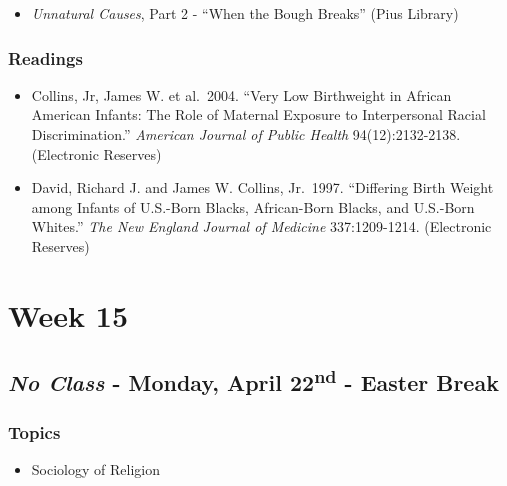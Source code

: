 \documentclass[]{book}
\providecommand{\tightlist}{%
  \setlength{\itemsep}{0pt}\setlength{\parskip}{0pt}}
\begin{document}
\begin{itemize}
\tightlist
\item
  \emph{Unnatural Causes}, Part 2 - ``When the Bough Breaks'' (Pius Library)
\end{itemize}

\hypertarget{readings-24}{%
\subsubsection*{Readings}\label{readings-24}}

\begin{itemize}
\tightlist
\item
  Collins, Jr, James W. et al.~2004. ``Very Low Birthweight in African American Infants: The Role of Maternal Exposure to Interpersonal Racial Discrimination.'' \emph{American Journal of Public Health} 94(12):2132-2138. (Electronic Reserves)
\item
  David, Richard J. and James W. Collins, Jr.~1997. ``Differing Birth Weight among Infants of U.S.-Born Blacks, African-Born Blacks, and U.S.-Born Whites.'' \emph{The New England Journal of Medicine} 337:1209-1214. (Electronic Reserves)
\end{itemize}

\hypertarget{week-15}{%
\section*{Week 15}\label{week-15}}

\hypertarget{no-class---monday-april-22nd---easter-break}{%
\subsection*{\texorpdfstring{\emph{No Class} - Monday, April 22\textsuperscript{nd} - Easter Break}{No Class - Monday, April 22nd - Easter Break}}\label{no-class---monday-april-22nd---easter-break}}

\hypertarget{topics-27}{%
\subsubsection*{Topics}\label{topics-27}}

\begin{itemize}
\tightlist
\item
  Sociology of Religion
\end{itemize}
\end{document}
